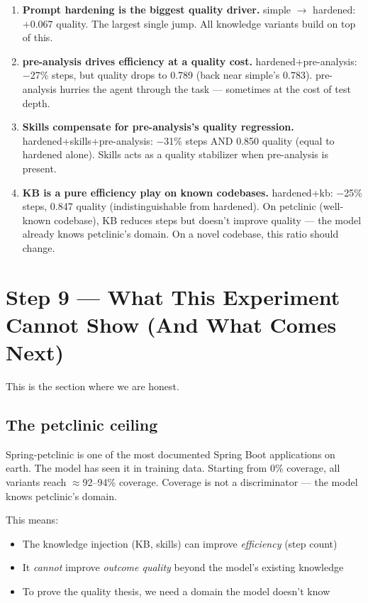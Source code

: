 \documentclass[11pt,a4paper]{article}
\begin{document}
\begin{findingbox}
\begin{enumerate}[leftmargin=1.5em]
  \item \textbf{Prompt hardening is the biggest quality driver.}
    simple $\to$ hardened: $+$0.067 quality. The largest single jump.
    All knowledge variants build on top of this.

  \item \textbf{pre-analysis drives efficiency at a quality cost.}
    hardened+pre-analysis: $-$27\% steps, but quality drops to 0.789 (back near simple's 0.783).
    pre-analysis hurries the agent through the task --- sometimes at the cost of test depth.

  \item \textbf{Skills compensate for pre-analysis's quality regression.}
    hardened+skills+pre-analysis: $-$31\% steps AND 0.850 quality (equal to hardened alone).
    Skills acts as a quality stabilizer when pre-analysis is present.

  \item \textbf{KB is a pure efficiency play on known codebases.}
    hardened+kb: $-$25\% steps, 0.847 quality (indistinguishable from hardened).
    On petclinic (well-known codebase), KB reduces steps but doesn't improve quality ---
    the model already knows petclinic's domain.
    On a novel codebase, this ratio should change.
\end{enumerate}
\end{findingbox}

\section{Step 9 --- What This Experiment Cannot Show (And What Comes Next)}

This is the section where we are honest.

\subsection*{The petclinic ceiling}

Spring-petclinic is one of the most documented Spring Boot applications on earth.
The model has seen it in training data.
Starting from 0\% coverage, all variants reach $\approx$92--94\% coverage.
Coverage is not a discriminator --- the model knows petclinic's domain.

This means:
\begin{itemize}
  \item The knowledge injection (KB, skills) can improve \emph{efficiency} (step count)
  \item It \emph{cannot} improve \emph{outcome quality} beyond the model's existing knowledge
  \item To prove the quality thesis, we need a domain the model doesn't know
\end{itemize}
\end{document}
